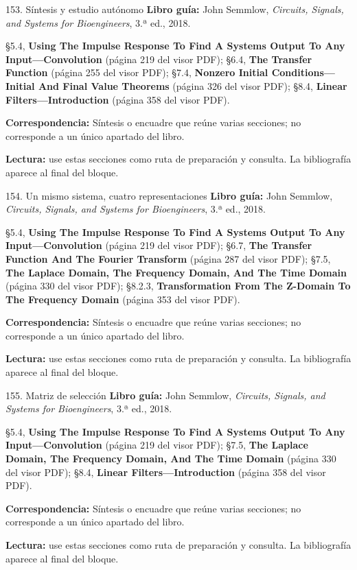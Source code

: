 \documentclass[
  10pt,
  ignorenonframetext,
  aspectratio=169,
  spanish,
]{beamer}
\begin{document}
\begin{frame}{153. Síntesis y estudio autónomo}
\label{suxedntesis-y-estudio-autuxf3nomo-2}
\textbf{Libro guía:} John Semmlow, \emph{Circuits, Signals, and Systems
for Bioengineers}, 3.ª ed., 2018.

§5.4, \textbf{Using The Impulse Response To Find A Systems Output To Any
Input---Convolution} (página 219 del visor PDF); §6.4, \textbf{The
Transfer Function} (página 255 del visor PDF); §7.4, \textbf{Nonzero
Initial Conditions---Initial And Final Value Theorems} (página 326 del
visor PDF); §8.4, \textbf{Linear Filters---Introduction} (página 358 del
visor PDF).

\textbf{Correspondencia:} Síntesis o encuadre que reúne varias
secciones; no corresponde a un único apartado del libro.

\textbf{Lectura:} use estas secciones como ruta de preparación y
consulta. La bibliografía aparece al final del bloque.
\end{frame}

\begin{frame}{154. Un mismo sistema, cuatro representaciones}
\label{un-mismo-sistema-cuatro-representaciones}
\textbf{Libro guía:} John Semmlow, \emph{Circuits, Signals, and Systems
for Bioengineers}, 3.ª ed., 2018.

§5.4, \textbf{Using The Impulse Response To Find A Systems Output To Any
Input---Convolution} (página 219 del visor PDF); §6.7, \textbf{The
Transfer Function And The Fourier Transform} (página 287 del visor PDF);
§7.5, \textbf{The Laplace Domain, The Frequency Domain, And The Time
Domain} (página 330 del visor PDF); §8.2.3, \textbf{Transformation From
The Z-Domain To The Frequency Domain} (página 353 del visor PDF).

\textbf{Correspondencia:} Síntesis o encuadre que reúne varias
secciones; no corresponde a un único apartado del libro.

\textbf{Lectura:} use estas secciones como ruta de preparación y
consulta. La bibliografía aparece al final del bloque.
\end{frame}

\begin{frame}{155. Matriz de selección}
\label{matriz-de-selecciuxf3n}
\textbf{Libro guía:} John Semmlow, \emph{Circuits, Signals, and Systems
for Bioengineers}, 3.ª ed., 2018.

§5.4, \textbf{Using The Impulse Response To Find A Systems Output To Any
Input---Convolution} (página 219 del visor PDF); §7.5, \textbf{The
Laplace Domain, The Frequency Domain, And The Time Domain} (página 330
del visor PDF); §8.4, \textbf{Linear Filters---Introduction} (página 358
del visor PDF).

\textbf{Correspondencia:} Síntesis o encuadre que reúne varias
secciones; no corresponde a un único apartado del libro.

\textbf{Lectura:} use estas secciones como ruta de preparación y
consulta. La bibliografía aparece al final del bloque.
\end{frame}
\end{document}

